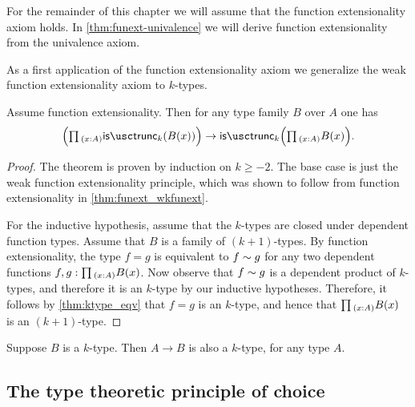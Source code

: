 For the remainder of this chapter we will assume that the function extensionality axiom holds. In \cref{thm:funext-univalence} we will derive function extensionality from the univalence axiom. 

As a first application of the function extensionality axiom we generalize the weak function extensionality axiom to $k$-types.

\begin{thm}\label{thm:trunc_pi}
Assume function extensionality. Then for any type family $B$ over $A$ one has
\begin{equation*}
\Big(\prd{x:A}\istrunc{k}(B(x))\Big)\to \istrunc{k}\Big(\prd{x:A}B(x)\Big).
\end{equation*}
\end{thm}

\begin{proof}
The theorem is proven by induction on $k\geq -2$. The base case is just the weak function extensionality principle, which was shown to follow from function extensionality in \cref{thm:funext_wkfunext}.

For the inductive hypothesis, assume that the $k$-types are closed under dependent function types. Assume that $B$ is a family of $(k+1)$-types. By function extensionality, the type $f=g$ is equivalent to $f\sim g$ for any two dependent functions $f,g:\prd{x:A}B(x)$. Now observe that $f\sim g$ is a dependent product of $k$-types, and therefore it is an $k$-type by our inductive hypotheses. Therefore, it follows by \cref{thm:ktype_eqv} that $f=g$ is an $k$-type, and hence that $\prd{x:A}B(x)$ is an $(k+1)$-type.
\end{proof}

\begin{cor}\label{cor:funtype_trunc}
Suppose $B$ is a $k$-type. Then $A\to B$ is also a $k$-type, for any type $A$.
\end{cor}

\subsection{The type theoretic principle of choice}

